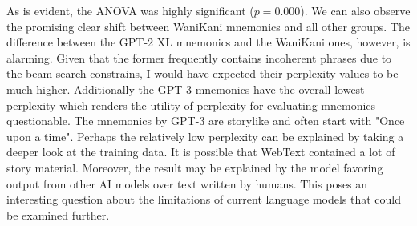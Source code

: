 As is evident, the ANOVA was highly significant ($p = 0.000$). We can also observe the promising clear shift between WaniKani mnemonics and all other groups. The difference between the GPT-2 XL mnemonics and the WaniKani ones, however, is alarming. Given that the former frequently contains incoherent phrases due to the beam search constrains, I would have expected their perplexity values to be much higher. Additionally the GPT-3 mnemonics have the overall lowest perplexity which renders the utility of perplexity for evaluating mnemonics questionable. The mnemonics by GPT-3 are storylike and often start with "Once upon a time". Perhaps the relatively low perplexity can be explained by taking a deeper look at the training data. It is possible that WebText contained a lot of story material. Moreover, the result may be explained by the model favoring output from other AI models over text written by humans. This poses an interesting question about the limitations of current language models that could be examined further. 

